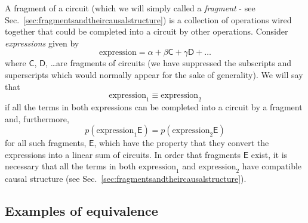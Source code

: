 \documentclass[10pt]{article}
\begin{document}
A fragment of a circuit (which we will simply called a \emph{fragment} - see Sec.\ \ref{sec:fragmentsandtheircausalstructure}) is a collection of operations wired together that could be completed into a circuit by other operations.  Consider \emph{expressions} given by
\begin{equation}
\text{expression}=\alpha + \beta \mathsf{C} + \gamma \mathsf{D}+ \dots
\end{equation}
where $\mathsf{C}$, $\mathsf{D}$, \dots are fragments of circuits (we have suppressed the subscripts and superscripts which would normally appear for the sake of generality).   We will say that
\begin{equation}
\text{expression}_1 \equiv \text{expression}_2
\end{equation}
if all the terms in both expressions can be completed into a circuit by a fragment and, furthermore,
\begin{equation}
p(\text{expression}_1 \mathsf{E}) = p(\text{expression}_2 \mathsf{E})
\end{equation}
for all such fragments, $\mathsf{E}$, which have the property that they convert the expressions into a linear sum of circuits.  In order that fragments $\mathsf E$ exist, it is necessary that all the terms in both $\text{expression}_1$ and $\text{expression}_2$ have compatible causal structure (see Sec.\ \ref{sec:fragmentsandtheircausalstructure}).


\subsection{Examples of equivalence}
\end{document}
